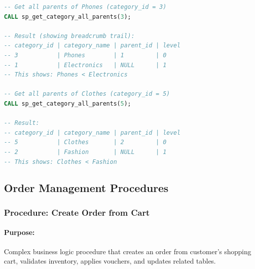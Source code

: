 \begin{lstlisting}[language=SQL]
-- Get all parents of Phones (category_id = 3)
CALL sp_get_category_all_parents(3);

-- Result (showing breadcrumb trail):
-- category_id | category_name | parent_id | level
-- 3           | Phones        | 1         | 0
-- 1           | Electronics   | NULL      | 1
-- This shows: Phones < Electronics

-- Get all parents of Clothes (category_id = 5)
CALL sp_get_category_all_parents(5);

-- Result:
-- category_id | category_name | parent_id | level
-- 5           | Clothes       | 2         | 0
-- 2           | Fashion       | NULL      | 1
-- This shows: Clothes < Fashion
\end{lstlisting}


\subsection{Order Management Procedures}

\subsubsection{Procedure: Create Order from Cart}

\paragraph{Purpose:} Complex business logic procedure that creates an order from customer's shopping cart, validates inventory, applies vouchers, and updates related tables.

